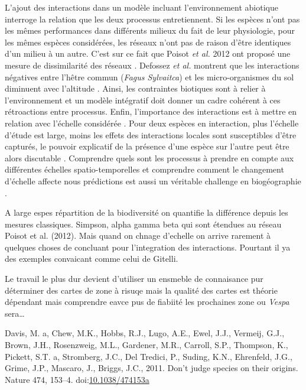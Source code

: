 L'ajout des interactions dans un modèle incluant l'environnement
abiotique interroge la relation que les deux processus entretiennent. Si
les espèces n'ont pas les mêmes performances dans différents milieux du
fait de leur physiologie, pour les mêmes espèces considérées, les
réseaux n'ont pas de raison d'être identiques d'un milieu à un autre.
C'est sur ce fait que Poisot \textit{et al.} 2012 ont proposé une mesure
de dissimilarité des réseaux \cite{Poisot2012}. Defossez \textit{et al.}
montrent que les interactions négatives entre l'hêtre commun
(\textit{Fagus Sylvaitca}) et les micro-organismes du sol diminuent avec
l'altitude \cite{Defossez2011}. Ainsi, les contraintes biotiques sont à
relier à l'environnement \cite{Brooker2006,Canham2006} et un modèle
intégratif doit donner un cadre cohérent à ces rétroactions entre
processus. Enfin, l'importance des interactions est à mettre en relation
avec l'échelle considérée \cite{Peterson2011}. Pour deux espèces en
interaction, plus l'échelle d'étude est large, moins les effets des
interactions locales sont susceptibles d'être capturés, le pouvoir
explicatif de la présence d'une espèce sur l'autre peut être alors
discutable \cite{Araujo2007}. Comprendre quels sont les processus à
prendre en compte aux différentes échelles spatio-temporelles et
comprendre comment le changement d'échelle affecte nous prédictions est
aussi un véritable challenge en biogéographie \cite{Martinez2012}.

A large espes répartition de la biodiversité on quantifie la différence
depuis les mesures classiques. Simpson, alpha gamma beta qui sont
étendues au réseau Poisot et al. (2012). Mais quand on chnage d'echelle
on arrive rarement à quelques choses de concluant pour l'integration des
interactions. Pourtant il ya des exemples convaicant comme celui de
Gitelli.

Le travail le plus dur devient d'utiliser un ensmeble de connaisance pur
déterminer des cartes de zone à risuqe mais la qualité des cartes est
théorie dépendant mais comprendre eavce pus de fiabiité les prochaines
zone ou \emph{Vespa} sera\ldots{}

\hypertarget{refs}{}
\hypertarget{ref-Davis2011}{}
Davis, M. a, Chew, M.K., Hobbs, R.J., Lugo, A.E., Ewel, J.J., Vermeij,
G.J., Brown, J.H., Rosenzweig, M.L., Gardener, M.R., Carroll, S.P.,
Thompson, K., Pickett, S.T. a, Stromberg, J.C., Del Tredici, P., Suding,
K.N., Ehrenfeld, J.G., Grime, J.P., Mascaro, J., Briggs, J.C., 2011.
Don't judge species on their origins. Nature 474, 153--4.
doi:\href{https://doi.org/10.1038/474153a}{10.1038/474153a}

